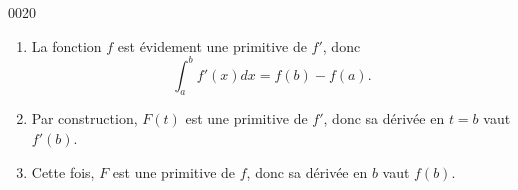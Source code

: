 \begin{corrige}{0020}

\begin{enumerate}

\item
La fonction $f$ est évidement une primitive de $f'$, donc
\begin{equation}
	\int_a^bf'(x)dx=f(b)-f(a).
\end{equation}

\item
Par construction, $F(t)$ est une primitive de $f'$, donc sa dérivée en $t=b$ vaut $f'(b)$.

\item
Cette fois, $F$ est une primitive de $f$, donc sa dérivée en $b$ vaut $f(b)$.

\end{enumerate}

\end{corrige}
